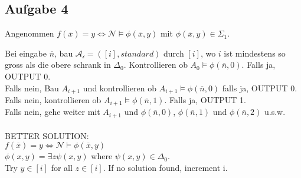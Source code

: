 \documentclass[12pt]{article}
\begin{document}
\subsection*{Aufgabe 4}
Angenommen $f(\overline x) = y \iff \mathcal{N} \models \phi(\overline x, y)$ mit $\phi(\overline x, y) \in \Sigma_1$.

Bei eingabe $\overline n$, bau $\mathcal{A_i} = ([i], standard)$ durch $[i]$, wo $i$ ist mindestens so gross als die obere schrank in $\Delta_0$. Kontrollieren ob $A_0 \models \phi(\overline n, 0)$. Falls ja, OUTPUT 0.\\
Falls nein, Bau $A_{i+1}$ und kontrollieren ob $A_{i+1} \models \phi(\overline n, 0)$ falls ja, OUTPUT 0. Falls nein, kontrollieren ob $A_{i+1} \models \phi(\overline n, 1)$. Falls ja, OUTPUT 1. \\
Falls nein, gehe weiter mit $A_{i+1}$ und $\phi(\overline n, 0)$, $\phi(\overline n, 1)$ und $\phi(\overline n, 2)$ u.s.w.
\\
\\
BETTER SOLUTION:\\
$f(\overline x) = y \iff \mathcal N \models \phi(\overline x, y)$\\
$\phi(x, y) = \exists z \psi(x, y)$ where $\psi(x, y) \in \Delta_0$.\\
Try $y \in [i]$ for all $z \in [i]$. If no solution found, increment i.
\end{document}
